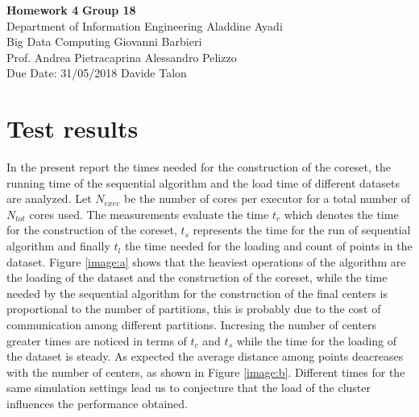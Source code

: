\documentclass[a4paper, 11pt]{article}
\begin{document}
\noindent
\large\textbf{Homework 4} \hfill \textbf{Group 18} \\
\normalsize Department of Information Engineering \hfill Aladdine Ayadi\\
Big Data Computing \hfill Giovanni Barbieri\\
Prof. Andrea Pietracaprina \hfill Alessandro Pelizzo\\
Due Date: 31/05/2018 \hfill Davide Talon


\section*{Test results}
In the present report the times needed for the construction of the coreset, the running time of the sequential algorithm and the load time of different datasets are analyzed.
Let $N_{exec}$ be the number of cores per executor for a total number of $N_{tot}$  cores used. The measurements evaluate the time $t_c$ which denotes the time for the construction of the coreset, $t_s$ represents the time for the run of sequential algorithm and finally $t_l$ the time needed for the loading and count of points in the dataset.
Figure \ref{image:a} shows that the heaviest operations of the algorithm are the loading of the dataset and the construction of the coreset,  while the time needed by the sequential algorithm for the construction of the final centers is proportional to the number of partitions, this is probably due to the cost of communication among different partitions.
Incresing the number of centers greater times are noticed  in terms of $t_c$ and $t_s$ while the time for the loading of the dataset is steady. As expected the average distance among points deacreases with the number of centers, as shown in Figure \ref{image:b}.
Different times for the same simulation settings lead us to conjecture that the load of the cluster influences the performance obtained.
\end{document}
